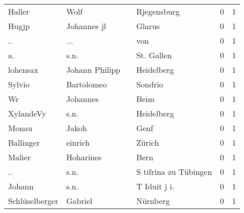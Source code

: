 \begin{center}
\begin{tiny}
\begin{longtabu}{llllrr}
                   Haller &                               Wolf &             &                                 Rjegensburg &          0 &         1 \\
                    Hugjp &                        Johannes jl &             &                                      Glarus &          0 &         1 \\
                       .. &                                ... &             &                                         von &          0 &         1 \\
                       a. &                               s.n. &             &                                  St. Gallen &          0 &         1 \\
                 lohensax &                     Johann Philipp &             &                                  Heidelberg &          0 &         1 \\
                   Sylvio &                         Bartolomeo &             &                                     Sondrio &          0 &         1 \\
                       Wr &                           Johannes &             &                                        Beim &          0 &         1 \\
                XylandeVy &                               s.n. &             &                                  Heidelberg &          0 &         1 \\
                    Monau &                              Jakoh &             &                                        Genf &          0 &         1 \\
                Ballinger &                            einrich &             &                                      Zürich &          0 &         1 \\
                   Malier &                          Hoharines &             &                                        Bern &          0 &         1 \\
                       .. &                               s.n. &             &                       S tifrina zu Tübingen &          0 &         1 \\
                   Johann &                               s.n. &             &                               T Iduit j i.  &          0 &         1 \\
           Schlüselberger &                            Gabriel &             &                                    Nürnberg &          0 &         1 \\

\end{longtabu}
\end{tiny}
\end{center}
